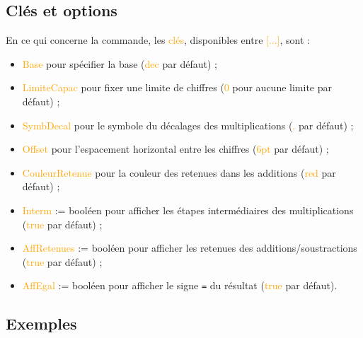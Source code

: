 \documentclass[french,a4paper,11pt]{article}
\newcommand\Cle[1]{{\small\sffamily\textlangle \textcolor{orange}{#1}\textrangle}}
\begin{document}
{{\begin{DemoCode}[]
\end{DemoCode}

\begin{DemoCode}[]
\end{DemoCode}

\subsection{Clés et options}

\begin{cautionblock}
En ce qui concerne la commande, les \Cle{clés}, disponibles entre \Cle{[...]}, sont :

\begin{itemize}
	\item \Cle{Base} pour spécifier la base (\Cle{dec} par défaut) ;
	\item \Cle{LimiteCapac} pour fixer une limite de chiffres (\Cle{0} pour aucune limite par défaut) ;
	\item \Cle{SymbDecal} pour le symbole du décalages des multiplications (\Cle{.} par défaut) ;
	\item \Cle{Offset} pour l'espacement horizontal entre les chiffres (\Cle{6pt} par défaut) ;
	\item \Cle{CouleurRetenue} pour la couleur des retenues dans les additions (\Cle{red} par défaut) ;
	\item \Cle{Interm} := booléen pour afficher les étapes intermédiaires des multiplications (\Cle{true} par défaut) ;
	\item \Cle{AffRetenues} := booléen pour afficher les retenues des additions/soustractions (\Cle{true} par défaut) ;
	\item \Cle{AffEgal} := booléen pour afficher le signe \texttt{=} du résultat (\Cle{true} par défaut).
\end{itemize}
\end{cautionblock}

\subsection{Exemples}

\begin{DemoCode}[]
\end{DemoCode}

\begin{DemoCode}[]


\end{DemoCode}}}
\end{document}
